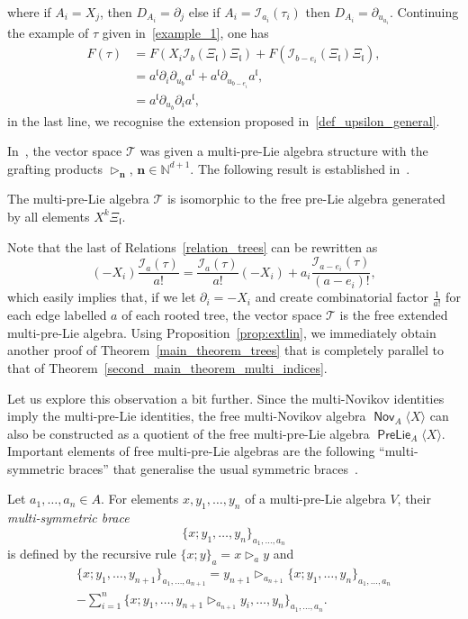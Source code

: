 \documentclass[AHL,Unicode,longabstracts]{cedram}
\newcommand{\bn}{\mathbf{n}}
\newcommand*\CT{\mathcal{T}}
\newcommand*\I{\mathcal{I}}
\newcommand*\CI{\I}
\newcommand{\mfl}{\mathfrak{l}}
\newcommand{\bbN}{\mathbb{N}}
\DeclareMathOperator{\PL}{\mathsf{PreLie}}
\DeclareMathOperator{\Nov}{\mathsf{Nov}}
\begin{document}
where if $A_i = X_j$, then $D_{A_i} = \partial_j$ else if $A_i = \CI_{a_i}(\tau_i)$ then $D_{A_i} = \partial_{u_{a_i}}$. Continuing the example of $\tau$ given in~\eqref{example_1}, one has
\begin{align*}
F(\tau) & = F(X_i \CI_{b}(\Xi_{\mfl}) \Xi_{\mfl}) + F(\CI_{b-e_i}(\Xi_{\mfl}) \Xi_{\mfl}),
\\ & = a^{\mfl} \partial_i \partial_{u_b} a^{\mfl} + a^{\mfl} \partial_{u_{b-e_i}} a^{\mfl},
\\ & = a^{\mfl} \partial_{u_b} \partial_i a^{\mfl},
\end{align*}
in the last line, we recognise the extension proposed in~\eqref{def_upsilon_general}.

In~\cite{BCCH}, the vector space $\CT$ was given a multi-pre-Lie algebra structure with the grafting products $\triangleright_\bn$, $\bn\in\bbN^{d+1}$. The following result is established in~\cite{BCCH,BM22}.

\begin{theo}\label{main_theorem_trees}
The multi-pre-Lie algebra $ \CT $ is isomorphic to the free pre-Lie algebra generated by all elements $ X^k \Xi_{\mfl} $.
\end{theo}

Note that the last of Relations~\eqref{relation_trees} can be rewritten as
\[
(-X_i) \frac{\I_a(\tau)}{a!}=\frac{\I_a(\tau)}{a!}(-X_i) + a_i\frac{\I_{a-e_i}(\tau)}{(a-e_i)!},
\]
which easily implies that, if we let $\partial_i=-X_i$ and create combinatorial factor $\frac{1}{a!}$ for each edge labelled $a$ of each rooted tree, the vector space $\CT$ is the free extended multi-pre-Lie algebra. Using Proposition~\ref{prop:extlin}, we immediately obtain another proof of Theorem~\ref{main_theorem_trees} that is completely parallel to that of Theorem~\ref{second_main_theorem_multi_indices}.

Let us explore this observation a bit further. Since the multi-Novikov identities imply the multi-pre-Lie identities, the free multi-Novikov algebra $\Nov_A\langle X\rangle$ can also be constructed as a quotient of the free multi-pre-Lie algebra $\PL_A\langle X\rangle$. Important elements of free multi-pre-Lie algebras are the following ``multi-symmetric braces'' that generalise the usual symmetric braces~\cite{LM}.

\begin{defi}\label{multi_braces}
Let $a_1,\dots,a_n\in A$. For elements $x,y_1,\dots,y_n$ of a multi-pre-Lie algebra $V$, their \emph{multi-symmetric brace}
\[
\{x;y_1,\dots,y_n\}_{a_1,\dots,a_n}
\]
is defined by the recursive rule $\{x;y\}_a=x\triangleright_a y$ and
\begin{multline*}
\{x;y_1,\dots,y_{n+1}\}_{a_1,\dots,a_{n+1}}
=y_{n+1}\triangleright_{a_{n+1}}\{x;y_1,\dots,y_{n}\}_{a_1,\dots,a_{n}} \\ -\sum_{i=1}^n
\{x;y_1,\dots,y_{n+1}\triangleright_{a_{n+1}}y_i,\dots,y_{n}\}_{a_1,\dots,a_{n}}.
\end{multline*}
\end{defi}
\end{document}
